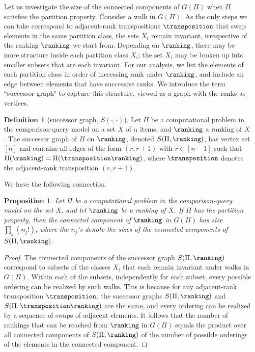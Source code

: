 \documentclass[11pt]{article}
\numberwithin{equation}{section}
\newtheorem{proposition}[theorem]{Proposition}
\theoremstyle{definition}
\newtheorem{definition}[theorem]{Definition}
\theoremstyle{plain}
\begin{document}
Let us investigate the size of the connected components of $G(\Pi)$ when $\Pi$ satisfies the partition property. Consider a walk in $G(\Pi)$. As the only steps we can take correspond to adjacent-rank transpositions $\transposition$ that swap elements in the same partition class, the sets $X_i$ remain invariant, irrespective of the ranking $\ranking$ we start from. Depending on $\ranking$, there may be more structure inside each partition class $X_i$; the set $X_i$ may be broken up into smaller subsets that are each invariant. For our analysis, we list the elements of each partition class in order of increasing rank under $\ranking$, and include an edge between elements that have successive ranks. We introduce the term ``successor graph" to capture this structure, viewed as a graph with the ranks as vertices.
\begin{definition}[successor graph, $S(\cdot,\cdot)$]
Let $\Pi$ be a computational problem in the comparison-query model on a set $X$ of $n$ items, and $\ranking$ a ranking of $X$. The successor graph of $\Pi$ on $\ranking$, denoted $S(\Pi,\ranking)$, has vertex set $[n]$ and contains all edges of the form $(r,r+1)$ with $r \in [n-1]$ such that $\Pi(\ranking) = \Pi(\transposition \ranking)$, where $\transposition$ denotes the adjacent-rank transposition $(r,r+1)$.
\end{definition}

We have the following connection.
\begin{proposition}\label{prop:successor:components}
Let $\Pi$ be a computational problem in the comparison-query model on the set $X$, and let $\ranking$ be a ranking of $X$. If $\Pi$ has the partition property, then the connected component of $\ranking$ in $G(\Pi)$ has size $\prod_j (n_j!)$, where the $n_j$'s denote the sizes of the connected components of $S(\Pi,\ranking)$.
\end{proposition}
\begin{proof}
The connected components of the successor graph $S(\Pi,\ranking)$ correspond to subsets of the classes $X_i$ that each remain invariant under walks in $G(\Pi)$. Within each of the subsets, independently for each subset, every possible ordering can be realized by such walks. This is because for any adjacent-rank transposition $\transposition$, the successor graphs $S(\Pi,\ranking)$ and $S(\Pi,\transposition \ranking)$ are the same, and every ordering can be realized by a sequence of swaps of adjacent elements. It follows that the number of rankings that can be reached from $\ranking$ in $G(\Pi)$ equals the product over all connected components of $S(\Pi,\ranking)$ of the number of possible orderings of the elements in the connected component. 
\end{proof}
\end{document}
